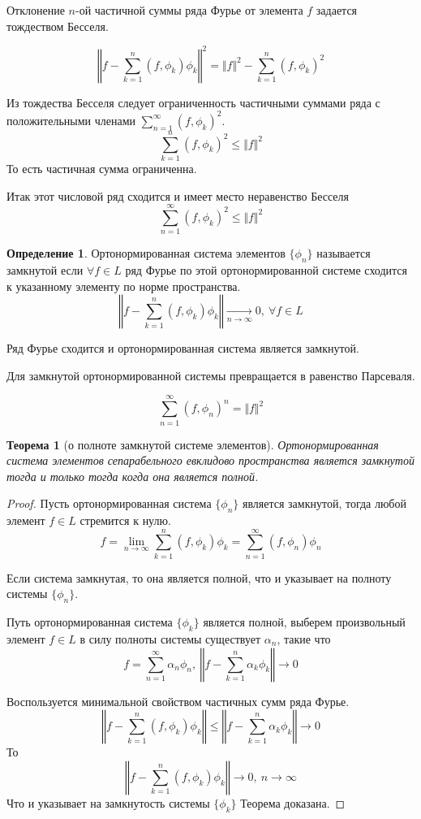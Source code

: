 \documentclass[14pt,a4paper]{extarticle}
\newtheorem{theorem}{Теорема}[section]
\theoremstyle{definition}
\newtheorem{definition}{Определение}[section]
\theoremstyle{remark}
\renewcommand{\[}{\begin{dmath*}[compact]}
\renewcommand{\]}{\end{dmath*}}
\newcommand{\sep}{ , \ \allowbreak }
\begin{document}
Отклонение $n$-ой частичной суммы ряда Фурье от элемента $f$ задается
тождеством Бесселя.

\[\left \Vert f - \sum_{k=1}^n (f,\phi_k) \phi_k \right \Vert ^ 2
= \Vert f \Vert ^ 2 - \sum_{k=1}^n(f,\phi_k)^2 \]

Из тождества Бесселя следует ограниченность частичными
суммами ряда с положительными членами $\sum_{n=1}^\infty (f,\phi_k)^2$.
\[\sum_{k=1}^n (f,\phi_k)^2 \leq \Vert f \Vert ^2 \]
То есть частичная сумма ограниченна.

Итак этот числовой ряд сходится и имеет место неравенство Бесселя
\[\sum_{n=1}^\infty (f,\phi_k)^2 \leq \Vert f \Vert ^2\]

\begin{definition}
  Ортонормированная система элементов $\{\phi_n\}$ называется замкнутой если
  $\forall f \in L$ ряд Фурье по этой ортонормированной системе сходится
  к указанному элементу по норме пространства.
  \[\left \Vert f - \sum_{k=1}^n (f,\phi_k) \phi_k \right \Vert
  \xrightarrow[n \to \infty]{} 0 \sep \forall f\in L\]
\end{definition}

Ряд Фурье сходится и ортонормированная система является замкнутой.

Для замкнутой ортонормированной системы превращается в равенство Пар\-се\-валя.

\[\sum_{n=1}^\infty (f, \phi_n)^n = \Vert f \Vert ^2\]

\begin{theorem}[о полноте замкнутой системе элементов]
  Ортонормированная система элементов сепарабельного евклидово пространства
  является замкнутой тогда и только тогда когда она является полной.
\end{theorem}

\begin{proof}
Пусть ортонормированная система $\{\phi_n\}$ является замкнутой,
тогда любой элемент $f \in L$ стремится к нулю.
\[f = \lim_{n \to \infty} \sum_{k=1}^n (f, \phi_k) \phi_k
= \sum_{n=1}^\infty (f,\phi_n) \phi_n\]

Если система замкнутая, то она является полной,
что и указывает на полноту системы $\{\phi_n\}$.

Путь ортонормированная система $\{\phi_k\}$ является полной,
выберем произвольный элемент $f \in L$ в силу полноты системы
существует $\alpha_n$, такие что
\[f = \sum_{n=1}^\infty \alpha_n \phi_n \sep
\left \Vert f - \sum_{k=1}^n \alpha_k \phi_k \right \Vert \to 0 \]

Воспользуется минимальной свойством частичных сумм ряда Фурье.
\[ \left\Vert f - \sum_{k=1}^n (f,\phi_k) \phi_k \right\Vert
\leq \left\Vert f - \sum_{k=1}^n \alpha_k \phi_k \right\Vert \to 0 \]
То
\[\left\Vert f - \sum_{k=1}^n (f,\phi_k) \phi_k \right\Vert \to 0 \sep
{n \to \infty}\]
Что и указывает на замкнутость системы $\{\phi_k\}$
Теорема доказана.
\end{proof}
\end{document}
